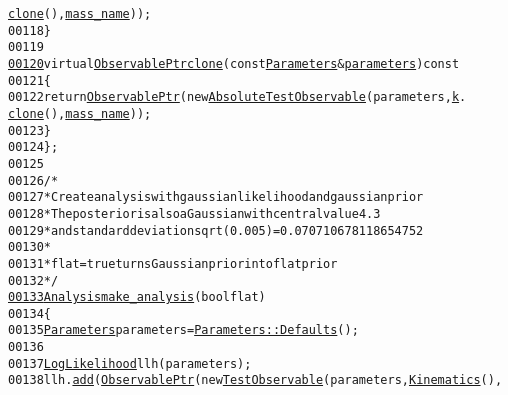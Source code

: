 \begin{footnotesize}
\begin{alltt}
      \hyperlink{classeos_1_1Kinematics_aedd9681136ab3735fb754e2840e10715}{clone}(), \hyperlink{structeos_1_1TestObservable_afa242c890fb7299876f30e8d01e218fc}{mass_name}));
00118             \}
00119 
\hypertarget{analysis__TEST_8hh_source_l00120}{}\hyperlink{structeos_1_1AbsoluteTestObservable_af0a14d774c083598130b3062f956c4c9}{00120}             \textcolor{keyword}{virtual} \hyperlink{namespaceeos_a470e5dd806bd129080f1aa0c2954646f}{ObservablePtr} \hyperlink{structeos_1_1AbsoluteTestObservable_ac509cca6dca7383653b2d0e5c387db07}{clone}(\textcolor{keyword}{const} \hyperlink{classeos_1_1Parameters}{Parameters} & \hyperlink{structeos_1_1TestObservable_ab6aef566fbe0f34117da1d484e20da40}{parameters})\textcolor{keyword}{ const}
00121 \textcolor{keyword}{            }\{
00122                 \textcolor{keywordflow}{return} \hyperlink{namespaceeos_a470e5dd806bd129080f1aa0c2954646f}{ObservablePtr}(\textcolor{keyword}{new} \hyperlink{structeos_1_1AbsoluteTestObservable_a0e044df3b5ec549d51547e8b9f8af55b}{AbsoluteTestObservable}(parameters, \hyperlink{structeos_1_1TestObservable_a58ef1eee27197c2bce21b2e576411a74}{k}.
      \hyperlink{classeos_1_1Kinematics_aedd9681136ab3735fb754e2840e10715}{clone}(), \hyperlink{structeos_1_1TestObservable_afa242c890fb7299876f30e8d01e218fc}{mass_name}));
00123             \}
00124     \};
00125 
00126     \textcolor{comment}{/*}
00127 \textcolor{comment}{     * Create analysis with gaussian likelihood and gaussian prior}
00128 \textcolor{comment}{     * The posterior is also a Gaussian with central value 4.3}
00129 \textcolor{comment}{     * and standard deviation sqrt(0.005)=0.070710678118654752}
00130 \textcolor{comment}{     *}
00131 \textcolor{comment}{     * flat = true turns Gaussian prior into flat prior}
00132 \textcolor{comment}{     */}
\hypertarget{analysis__TEST_8hh_source_l00133}{}\hyperlink{namespaceeos_ae42e0cf8b4c1c3548fc27a5add336258}{00133}     \hyperlink{classeos_1_1Analysis}{Analysis} \hyperlink{namespaceeos_ae42e0cf8b4c1c3548fc27a5add336258}{make_analysis}(\textcolor{keywordtype}{bool} flat)
00134     \{
00135         \hyperlink{classeos_1_1Parameters}{Parameters} parameters = \hyperlink{classeos_1_1Parameters_a1fa30b2210827623e6bf9f3ac4d2fd94}{Parameters::Defaults}();
00136 
00137         \hyperlink{classeos_1_1LogLikelihood}{LogLikelihood} llh(parameters);
00138         llh.\hyperlink{classeos_1_1LogLikelihood_a236d8123a08805e1d825ca262bada0c8}{add}(\hyperlink{namespaceeos_a470e5dd806bd129080f1aa0c2954646f}{ObservablePtr}(\textcolor{keyword}{new} \hyperlink{structeos_1_1TestObservable}{TestObservable}(parameters, \hyperlink{classeos_1_1Kinematics}{Kinematics}(),

\end{alltt}
\end{footnotesize}
